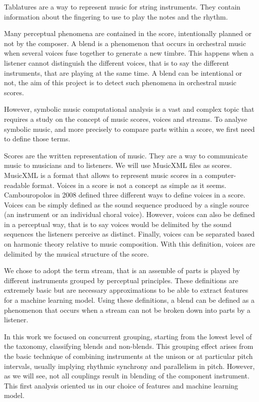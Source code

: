 \documentclass[11pt, a4paper]{article}
\begin{document}
Tablatures are a way to represent music for string instruments. They contain information about the fingering to use to play the notes and the rhythm.

Many perceptual phenomena are contained in the score, intentionally planned or not by the composer.
A blend is a phenomenon that occurs in orchestral music when several voices fuse together to generate a new timbre\cite{}.
This happens when a listener cannot distinguish the different voices, that is to say the different instruments, that are playing at the same time.
A blend can be intentional or not, the aim of this project is to detect such phenomena in orchestral music scores.


However, symbolic music computational analysis is a vast and complex topic that requires a study on the concept of music scores, voices and streams.
To analyse symbolic music, and more precisely to compare parts within a score, we first need to define those terms.

Scores are the written representation of music. They are a way to communicate music to musicians and to listeners.
We will use MusicXML files as scores. MusicXML is a format that allows to represent music scores in a computer-readable format.
Voices in a score is not a concept as simple as it seems. Cambouropolos in 2008 defined three different ways to define voices in a score.
Voices can be simply defined as the sound sequence produced by a single source (an instrument or an individual choral voice).
However, voices can also be defined in a perceptual way, that is to say voices would be delimited by the sound sequences the listeners perceive as distinct.
Finally, voices can be separated based on harmonic theory relative to music composition.
With this definition, voices are delimited by the musical structure of the score\cite{vaswaniAttentionAllYou2023}.

We chose to adopt the term stream, that is an assemble of parts is played by different instruments grouped by perceptual principles.
These definitions are extremely basic but are necessary approximations to be able to extract features for a machine learning model.
Using these definitions, a blend can be defined as a phenomenon that occurs when a stream can not be broken down into parts by a listener.


In this work we focused on concurrent grouping, starting from the lowest level of the taxonomy, classifying blends and non-blends.
This grouping effect arises from the basic technique of combining instruments at the unison or at particular pitch intervals, usually implying rhythmic synchrony and parallelism in pitch.
However, as we will see, not all couplings result in blending of the component instrument.
This first analysis oriented us in our choice of features and machine learning model\cite{}.
\end{document}
